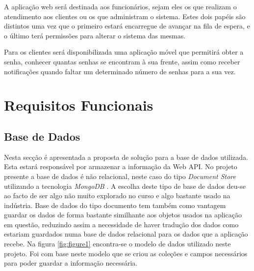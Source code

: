 \documentclass[12pt,a4paper]{article}
\begin{document}
A aplicação web será destinada aos funcionários, sejam eles os que realizam o atendimento aos
clientes ou os que administram o sistema. Estes dois papéis são distintos uma vez que o primeiro estará
encarregue de avançar na fila de espera, e o último terá permissões para alterar o sistema das mesmas.

Para os clientes será disponibilizada uma aplicação móvel que permitirá obter a senha, conhecer
quantas senhas se encontram à sua frente, assim como receber notificações quando faltar um
determinado número de senhas para a sua vez.

\pagebreak
\section{Requisitos Funcionais}
\subsection{Base de Dados}
Nesta secção é apresentada a proposta de solução para a base de dados utilizada. Esta estará responsável
por armazenar a informação da Web API. No projeto presente a base de dados é não relacional, neste caso do tipo
\textit{Document Store} utilizando a tecnologia \textit{MongoDB} \cite{mongoDBReference}. A escolha deste tipo de base de dados deu-se ao 
facto de ser algo não muito explorado no curso e algo bastante usado na indústria. Base de dados do tipo documento
tem também como vantagem guardar os dados de forma bastante similhante aos objetos usados na aplicação em questão, reduzindo 
assim a necessidade de haver tradução dos dados como estariam guardados numa base de dados relacional para os dados que a aplicação recebe.
Na figura \ref{fig:figure1} encontra-se o modelo de dados utilizado neste projeto. Foi com base neste modelo que se criou as coleções e campos necessários para poder 
guardar a informação necessária.\par
\end{document}

